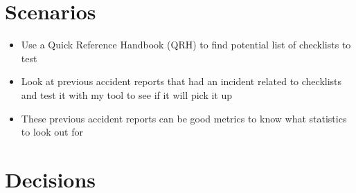\documentclass[../dissertation.tex]{subfiles}
\begin{document}
\section{Scenarios}
\begin{itemize}
  \item Use a Quick Reference Handbook (QRH) to find potential list of checklists to test
  \item Look at previous accident reports that had an incident related to checklists
    and test it with my tool to see if it will pick it up
  \item These previous accident reports can be good metrics to know what statistics to
    look out for
\end{itemize}


\section{Decisions}
\end{document}
